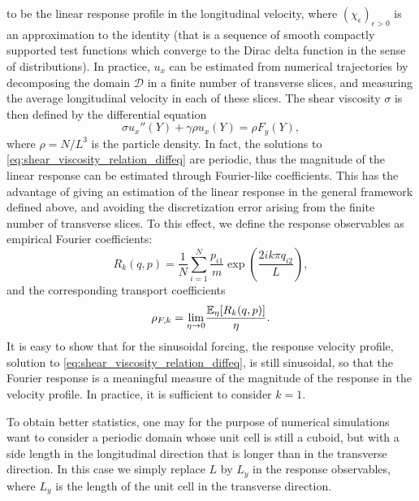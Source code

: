 to be the linear response profile in the longitudinal velocity, where $(\chi_\epsilon)_{\epsilon>0}$ is an approximation to the identity (that is a sequence of smooth compactly supported test functions which converge to the Dirac delta function in the sense of distributions).
In practice, $u_x$ can be estimated from numerical trajectories by decomposing the domain $\mathcal D$ in a finite number of transverse slices,
 and measuring the average longitudinal velocity in each of these slices.
 The shear viscosity $\sigma$ is then defined by the differential equation
\begin{equation}
    \label{eq:shear_viscosity_relation_diffeq}
    \sigma u_x''(Y)+\gamma \rho u_x(Y)=\rho F_y(Y),
\end{equation}
where $\rho= N/L^3$ is the particle density.
In fact, the solutions to \eqref{eq:shear_viscosity_relation_diffeq} are periodic, thus the magnitude of the linear response can be estimated through Fourier-like coefficients.
This has the advantage of giving an estimation of the linear response in the general framework defined above, and avoiding the discretization error arising from the finite number of transverse slices.
To this effect, we define the response observables as empirical Fourier coefficients:
\begin{equation}
    \label{eq:nemd_shear_viscosity_response}
    R_k(q,p)=\frac{1}N\sum_{i=1}^N\frac{p_{i1}}{m}\exp\left(\frac{2ik\pi q_{i2}}{L}\right),
\end{equation}
and the corresponding transport coefficients
\begin{equation}
    \label{eq:shear_viscosity_tranpsort_coefficient}
    \rho_{F,k}=\underset{\eta\to 0}{\lim}\frac{\mathbb{E}_\eta[R_k(q,p)]}{\eta}.
\end{equation}
It is easy to show that for the sinusoidal forcing, the response velocity profile, solution to \eqref{eq:shear_viscosity_relation_diffeq}, is still sinusoidal, so that the Fourier response is a meaningful measure of the magnitude of the response in the velocity profile.
In practice, it is sufficient to consider $k=1$.
\begin{remark}
    To obtain better statistics, one may for the purpose of numerical simulations want to consider a periodic domain whose unit cell is still a cuboid, but with a side length in the longitudinal direction that is longer than in the transverse direction.
    In this case we simply replace $L$ by $L_y$ in the response observables, where $L_y$ is the length of the unit cell in the transverse direction.
\end{remark}
